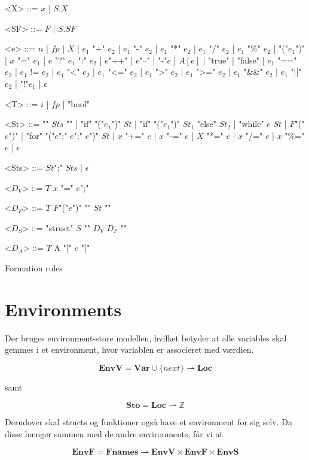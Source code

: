 \begin{Grammar}
 \begin{grammar}

 <X> ::= $x$ | $S.X$
 
 <SF> ::= $F$ | $S.SF$

 <e> ::= $n$ | $fp$ | $X$  | $e_1$ "+" $e_2$ | $e_1$ "-" $e_2$ | $e_1$ "*" $e_2$ | $e_1$ "/" $e_2$ | $e_1$ "\%" $e_2$ | "("$e_1$")" | $x$ "=" $e_1$ | $e$ "?" $e_1$ ":" $e_2$ | $e$"++" | $e$"--" | "-"$e$ | $A[e]$ | "true" | "false" | $e_1$ "==" $e_2$ | $e_1$ != $e_2$ | $e_1$ "<" $e_2$ | $e_1$ "<=" $e_2$ | $e_1$ ">" $e_2$ | $e_1$ ">=" $e_2$ | $e_1$ "\&\&" $e_2$ | $e_1$ "||" $e_2$ | "!"$e_1$ | $\epsilon$

 <T> ::= $i$ | $fp$ | "bool"
 
 <St> ::= "{" $Sts$ "}" | "if" "("$e_1$")" $St$ | "if" "("$e_1$")" $St_1$ "else" $St_2$ | "while" $e$ $St$ | $F$"("$e$")" | "for" "("$e$";" $e$";" $e$")" $St$ | $x$ "+=" $e$ | $x$ "-=" $e$ | $X$ "*=" $e$ | $x$ "/=" $e$ | $x$ "\%=" $e$ | $\epsilon$
 
 <Sts> ::= $St$";" $Sts$ | $\epsilon$
 
 <$D_V$> ::= $T$ $x$ "=" $e$";"
 
 <$D_F$> ::= $T$ $F$"("$e$")" "{" $St$ "}"
 
 <$D_S$> ::= "struct" $S$ "{" $D_V$ $D_F$ "}"
 
 <$D_A$> ::= $T$ A "[" $e$ "]"

 \end{grammar}
 \caption{Formation rules}\label{gra:formationrules}
\end{Grammar}

\tocless \section{Environments}

\noindent Der bruges environment-store modellen, hvilket betyder at alle variables skal gemmes i et environment, hvor variablen er associeret med værdien.

$$ \textbf{EnvV} = \textbf{Var} \cup \{next\} \rightharpoonup \textbf{Loc} $$

\noindent samt

$$ \textbf{Sto} = \textbf{Loc} \rightharpoonup \mathds{Z} $$

\noindent Derudover skal structs og funktioner også have et environment for sig selv. Da disse hænger sammen med de andre environments, får vi at

$$ \textbf{EnvF} = \textbf{Fnames} \rightharpoonup \textbf{EnvV} \times \textbf{EnvF} \times \textbf{EnvS} $$

